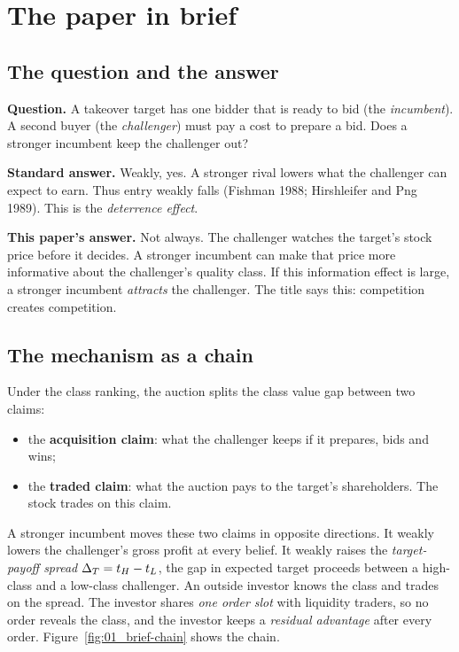 \section{The paper in brief}\label{sec:01_brief}

\subsection{The question and the answer}\label{sec:01_brief-question}

\textbf{Question.} A takeover target has one bidder that is ready to bid (the \emph{incumbent}). A second
buyer (the \emph{challenger}) must pay a cost to prepare a bid. Does a stronger incumbent keep the
challenger out?

\textbf{Standard answer.} Weakly, yes. A stronger rival lowers what the challenger can expect to earn. Thus entry weakly falls (Fishman 1988; Hirshleifer and Png 1989). This is the
\emph{deterrence effect}.

\textbf{This paper's answer.} Not always. The challenger watches the target's stock price before it
decides. A stronger incumbent can make that price more informative about the challenger's quality class.
If this information effect is large, a stronger incumbent \emph{attracts} the challenger. The title says
this: competition creates competition.

\subsection{The mechanism as a chain}\label{sec:01_brief-mechanism}

Under the class ranking, the auction splits the class value gap between two claims:
\begin{itemize}
\item the \textbf{acquisition claim}: what the challenger keeps if it prepares, bids and wins;
\item the \textbf{traded claim}: what the auction pays to the target's shareholders. The stock trades on
this claim.
\end{itemize}
A stronger incumbent moves these two claims in opposite directions. It weakly lowers the challenger's gross
profit at every belief. It weakly raises the \emph{target-payoff spread} \(\Delta_T=t_H-t_L\), the gap in expected
target proceeds between a high-class and a low-class challenger. An outside investor knows the class and
trades on the spread. The investor shares \emph{one order slot} with liquidity traders, so no order
reveals the class, and the investor keeps a \emph{residual advantage} after every order.
Figure~\ref{fig:01_brief-chain} shows the chain.

